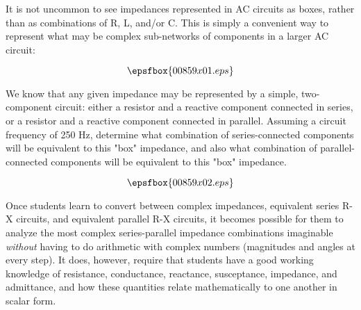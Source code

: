 

It is not uncommon to see impedances represented in AC circuits as boxes, rather than as combinations of R, L, and/or C.  This is simply a convenient way to represent what may be complex sub-networks of components in a larger AC circuit:

$$\epsfbox{00859x01.eps}$$

We know that any given impedance may be represented by a simple, two-component circuit: either a resistor and a reactive component connected in series, or a resistor and a reactive component connected in parallel.  Assuming a circuit frequency of 250 Hz, determine what combination of series-connected components will be equivalent to this "box" impedance, and also what combination of parallel-connected components will be equivalent to this "box" impedance.







$$\epsfbox{00859x02.eps}$$







Once students learn to convert between complex impedances, equivalent series R-X circuits, and equivalent parallel R-X circuits, it becomes possible for them to analyze the most complex series-parallel impedance combinations imaginable {\it without} having to do arithmetic with complex numbers (magnitudes and angles at every step).  It does, however, require that students have a good working knowledge of resistance, conductance, reactance, susceptance, impedance, and admittance, and how these quantities relate mathematically to one another in scalar form.




